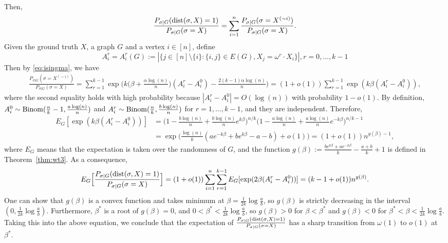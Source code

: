 \documentclass{article}
\begin{document}
Then,
$$
\frac{P_{\sigma|G} ( \operatorname{dist}(\sigma, X) = 1 )}{P_{\sigma|G}(\sigma= X)}
=\sum_{i=1}^n \frac{P_{\sigma|G} ( \sigma= X^{(\sim i)} )} {P_{\sigma|G}(\sigma= X)} .
$$
Given the ground truth $X$, a graph $G$ and a vertex $i\in[n]$, define
\begin{equation*}
A^r_i=A^r_i(G):=|\{j\in[n]\setminus\{i\}:\{i,j\}\in E(G), X_j=\omega^r \cdot X_i\} |, r=0, \dots, k-1
\end{equation*}
Then by \eqref{eq:isingma}, we have
\begin{align*}
\frac{P_{\sigma|G}(\sigma=X^{(\sim i)} )}
{P_{\sigma|G}(\sigma=X)}
 = \sum_{r=1}^{k-1}\exp\Big(k\big(\beta+\frac{\alpha\log(n)}{n} \big) (A^r_i-A^0_i)
-\frac{2(k-1)\alpha\log(n)}{n} \Big) 
 = (1+o(1)) \sum_{r=1}^{k-1}\exp (k \beta(A^r_i-A^0_i))  ,
\end{align*}
where the second equality holds with high probability because $|A^r_i-A^0_i|=O(\log(n))$ with probability $1-o(1)$.
By definition,
$A^0_i\sim \operatorname{Binom}(\frac{n}{k}-1,\frac{a\log(n)}{n})$ and $A^r_i\sim \operatorname{Binom}(\frac{n}{k}, \frac{b\log(n)}{n})$ for $r=1,\dots, k-1$, and they are independent. Therefore,
\begin{align*}
E_G[\exp (k \beta (A^r_i-A^0_i))]
& =\Big(1-\frac{b\log(n)}{n}+\frac{b\log(n)}{n} e^{k\beta} \Big)^{n/k}
\Big(1-\frac{a\log(n)}{n}+\frac{a\log(n)}{n} e^{-k\beta} \Big)^{n/k-1}  \\
& = 
\exp\Big(\frac{\log(n)}{k} ( a e^{-k\beta}+b e^{k\beta} -a-b )
+o(1) \Big) 
 = (1+o(1)) n^{g(\beta)-1} ,
\end{align*}
where $E_G$ means that the expectation is taken over the randomness of $G$, and the function
$g(\beta)  := \frac{b e^{k\beta}+a e^{-k\beta}}{k}-\frac{a+b}{k}+1$ is defined in Theorem~\ref{thm:wt3}.
As a consequence,
\begin{equation} \label{eq:mew}
E_G \Big[ \frac{P_{\sigma|G} ( \operatorname{dist}(\sigma, X) = 1 )}{P_{\sigma|G}(\sigma= X)} \Big]
= (1+o(1)) \sum_{i=1}^n\sum_{r=1}^{k-1} E_G[\exp (2 \beta (A^r_i-A^0_i))]
= (k-1+o(1)) n^{g(\beta)} .
\end{equation}
One can show that $g(\beta)$ is a convex function and takes minimum at $\beta=\frac{1}{2k}\log\frac{a}{b}$, so $g(\beta)$ is strictly decreasing in the interval $(0,\frac{1}{2k}\log\frac{a}{b})$. Furthermore, $\beta^\ast$ is a root of $g(\beta)=0$, and $0<\beta^\ast<\frac{1}{2k}\log\frac{a}{b}$, so $g(\beta)>0$ for $\beta<\beta^\ast$ and $g(\beta)<0$ for $\beta^\ast<\beta<\frac{1}{2k}\log\frac{a}{b}$.
Taking this into the above equation, we conclude that the expectation of $\frac{P_{\sigma|G} ( \operatorname{dist}(\sigma, X) = 1 )}{P_{\sigma|G}(\sigma= X)}$ has a sharp transition from $\omega(1)$ to $o(1)$ at $\beta^\ast$.
\end{document}
